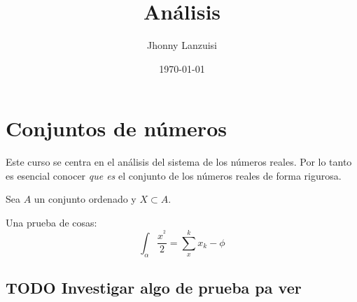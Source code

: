 \documentclass[11pt]{article}
\author{Jhonny Lanzuisi}
\date{\today}
\title{Análisis}
\begin{document}
\maketitle
\setcounter{tocdepth}{2}
\tableofcontents


\section{Conjuntos de números}
\label{sec:org9000861}

Este curso se centra en el análisis del sistema de los números reales.
Por lo tanto es esencial conocer \emph{que es} el conjunto de los números reales de forma rigurosa.

\begin{definition}
Sea \(A\) un conjunto ordenado y \(X\subset A\).
\end{definition}

Una prueba de cosas:
\[ \int_{\alpha}\frac{x^{^{2}}}{2} = \sum_{x}^{k} x_{k} -\phi \]

\subsection{{\bfseries\sffamily TODO} Investigar algo de prueba pa ver}
\label{sec:orge39803e}
\end{document}
